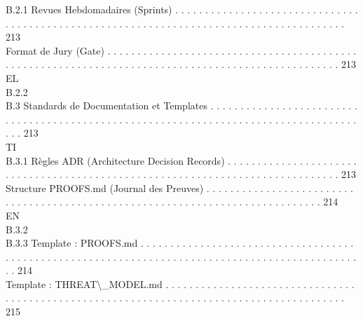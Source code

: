 B.2.1              Revues Hebdomadaires (Sprints) . . . . . . . . . . . . . . . . . . . . . . . . . . . . . . . . . . . . . . . . . . . . . . . . . . . . . . . . . . . . . . . . . . . . . . . . . . . . . . . . . . . . . . . . 213\\
Format de Jury (Gate) . . . . . . . . . . . . . . . . . . . . . . . . . . . . . . . . . . . . . . . . . . . . . . . . . . . . . . . . . . . . . . . . . . . . . . . . . . . . . . . . . . . . . . . . . . . . . . . . . . 213\\
\vspace{0.5em}
\vspace{0.5em}
\vspace{0.5em}
\vspace{0.5em}
EL\\
B.2.2\\
B.3     Standards de Documentation et Templates . . . . . . . . . . . . . . . . . . . . . . . . . . . . . . . . . . . . . . . . . . . . . . . . . . . . . . . . . . . . . . . . . . . . . . . . . . . . . . . . . . . . . . . 213\\
\vspace{0.5em}
\vspace{0.5em}
\vspace{0.5em}
\vspace{0.5em}
TI\\
B.3.1              Règles ADR (Architecture Decision Records) . . . . . . . . . . . . . . . . . . . . . . . . . . . . . . . . . . . . . . . . . . . . . . . . . . . . . . . . . . . . . . . . . . . . . . . . . . . . . . 213\\
Structure PROOFS.md (Journal des Preuves) . . . . . . . . . . . . . . . . . . . . . . . . . . . . . . . . . . . . . . . . . . . . . . . . . . . . . . . . . . . . . . . . . . . . . . . . . . . . . . 214\\
\vspace{0.5em}
\vspace{0.5em}
\vspace{0.5em}
\vspace{0.5em}
EN\\
B.3.2\\
B.3.3              Template : PROOFS.md . . . . . . . . . . . . . . . . . . . . . . . . . . . . . . . . . . . . . . . . . . . . . . . . . . . . . . . . . . . . . . . . . . . . . . . . . . . . . . . . . . . . . . . . . . . . . . . . . 214\\
Template : THREAT\textbackslash{}_MODEL.md . . . . . . . . . . . . . . . . . . . . . . . . . . . . . . . . . . . . . . . . . . . . . . . . . . . . . . . . . . . . . . . . . . . . . . . . . . . . . . . . . . . . . . . . . 215\\
